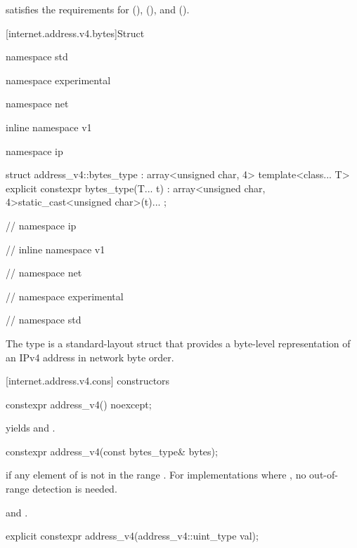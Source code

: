 \pnum
{} satisfies the requirements for  (),  (), and  ().


[internet.address.v4.bytes]{Struct }

\begin{codeblock}
namespace std {
namespace experimental {
namespace net {
inline namespace v1 {
namespace ip {

  struct address_v4::bytes_type : array<unsigned char, 4>
  {
    template<class... T> explicit constexpr bytes_type(T... t)
      : array<unsigned char, 4>{{static_cast<unsigned char>(t)...}} {}
  };

} // namespace ip
} // inline namespace v1
} // namespace net
} // namespace experimental
} // namespace std
\end{codeblock}

\pnum
The  type is a standard-layout struct that provides a byte-level representation of an IPv4 address in network byte order.



[internet.address.v4.cons]{ constructors}

\begin{itemdecl}
constexpr address_v4() noexcept;
\end{itemdecl}

\begin{itemdescr}
\pnum
\postconditions {} yields  and .
\end{itemdescr}

\begin{itemdecl}
constexpr address_v4(const bytes_type& bytes);
\end{itemdecl}

\begin{itemdescr}
\pnum
\remarks {} if any element of  is not in the range \tcode{[0, 0xFF]}. \enternote For implementations where , no out-of-range detection is needed. \exitnote

\pnum
\postconditions {} and .
\end{itemdescr}

\begin{itemdecl}
explicit constexpr address_v4(address_v4::uint_type val);
\end{itemdecl}

